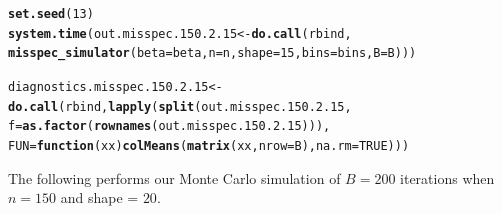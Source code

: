 \documentclass[11pt]{article}\usepackage[]{graphicx}\usepackage[]{color}
\makeatletter
\newcommand{\hlnum}[1]{\textcolor[rgb]{0.686,0.059,0.569}{#1}}%
\newcommand{\hlstd}[1]{\textcolor[rgb]{0.345,0.345,0.345}{#1}}%
\newcommand{\hlkwa}[1]{\textcolor[rgb]{0.161,0.373,0.58}{\textbf{#1}}}%
\newcommand{\hlkwb}[1]{\textcolor[rgb]{0.69,0.353,0.396}{#1}}%
\newcommand{\hlkwc}[1]{\textcolor[rgb]{0.333,0.667,0.333}{#1}}%
\newcommand{\hlkwd}[1]{\textcolor[rgb]{0.737,0.353,0.396}{\textbf{#1}}}%
\newenvironment{kframe}{%
 \def\at@end@of@kframe{}%
 \ifinner\ifhmode%
  \def\at@end@of@kframe{\end{minipage}}%
  \begin{minipage}{\columnwidth}%
 \fi\fi%
 \def\FrameCommand##1{\hskip\@totalleftmargin \hskip-\fboxsep
 \colorbox{shadecolor}{##1}\hskip-\fboxsep
     \hskip-\linewidth \hskip-\@totalleftmargin \hskip\columnwidth}%
 \MakeFramed {\advance\hsize-\width
   \@totalleftmargin\z@ \linewidth\hsize
   \@setminipage}}%
 {\par\unskip\endMakeFramed%
 \at@end@of@kframe}
\newenvironment{knitrout}{}{} %
\makeatother
\begin{document}
\begin{knitrout}
\color{fgcolor}\begin{kframe}
\begin{alltt}
\hlkwd{set.seed}\hlstd{(}\hlnum{13}\hlstd{)}
\hlkwd{system.time}\hlstd{(out.misspec.150.2.15} \hlkwb{<-} \hlkwd{do.call}\hlstd{(rbind,}
  \hlkwd{misspec_simulator}\hlstd{(}\hlkwc{beta} \hlstd{= beta,} \hlkwc{n} \hlstd{= n,} \hlkwc{shape} \hlstd{=} \hlnum{15}\hlstd{,} \hlkwc{bins} \hlstd{= bins,} \hlkwc{B} \hlstd{= B)))}
\end{alltt}


{\ttfamily\noindent\bfseries\color{errorcolor}{\#\# Error in chol.default(crossprod(x) + lambda[j] * diag(v)): the leading minor of order 5 is not positive definite}}

{\ttfamily\noindent\itshape\color{messagecolor}{\#\# Timing stopped at: 0.65 0 0.65}}\begin{alltt}
\hlstd{diagnostics.misspec.150.2.15} \hlkwb{<-} \hlkwd{do.call}\hlstd{(rbind,} \hlkwd{lapply}\hlstd{(}\hlkwd{split}\hlstd{(out.misspec.150.2.15,}
  \hlkwc{f} \hlstd{=} \hlkwd{as.factor}\hlstd{(}\hlkwd{rownames}\hlstd{(out.misspec.150.2.15))),}
  \hlkwc{FUN} \hlstd{=} \hlkwa{function}\hlstd{(}\hlkwc{xx}\hlstd{)} \hlkwd{colMeans}\hlstd{(}\hlkwd{matrix}\hlstd{(xx,} \hlkwc{nrow} \hlstd{= B),} \hlkwc{na.rm} \hlstd{=} \hlnum{TRUE}\hlstd{)))}
\end{alltt}


{\ttfamily\noindent\bfseries\color{errorcolor}{\#\# Error in split(out.misspec.150.2.15, f = as.factor(rownames(out.misspec.150.2.15))): object 'out.misspec.150.2.15' not found}}\end{kframe}
\end{knitrout}


The following performs our Monte Carlo simulation of $B = 200$ iterations 
when $n = 150$ and shape = $20$.
\end{document}
